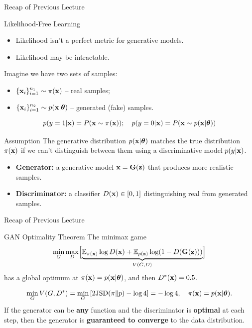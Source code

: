 \documentclass{beamer}
\begin{document}
\begin{frame}
	\titlepage
	\resetonslide	
\end{frame}
\begin{frame}{Recap of Previous Lecture}
	\begin{block}{Likelihood-Free Learning}
		\begin{itemize}
			\item Likelihood isn't a perfect metric for generative models.
			\item Likelihood may be intractable.
		\end{itemize}
	\end{block}
	Imagine we have two sets of samples:
	\begin{itemize}
		\item $\{\mathbf{x}_i\}_{i=1}^{n_1} \sim \pi(\mathbf{x})$ -- real samples;
		\item $\{\mathbf{x}_i\}_{i=1}^{n_2} \sim p(\mathbf{x} | \boldsymbol{\theta})$ -- generated (fake) samples.
	\end{itemize}
	\[
		p(y = 1 | \mathbf{x}) = P(\mathbf{x} \sim \pi(\mathbf{x})); \quad p(y = 0 | \mathbf{x}) = P(\mathbf{x} \sim p(\mathbf{x} | \boldsymbol{\theta}))
	\]
	\vspace{-0.5cm}
	\begin{block}{Assumption}
		The generative distribution $p(\mathbf{x} | \boldsymbol{\theta})$ matches the true distribution $\pi(\mathbf{x})$ if we can't distinguish between them using a discriminative model $p(y|\mathbf{x})$.
	\end{block}
	\begin{itemize}
		\item \textbf{Generator:} a generative model $\mathbf{x} = \mathbf{G}(\mathbf{z})$ that produces more realistic samples.
		\item \textbf{Discriminator:} a classifier $D(\mathbf{x}) \in [0, 1]$ distinguishing real from generated samples.
	\end{itemize}
\end{frame}
\begin{frame}{Recap of Previous Lecture}
	\begin{block}{GAN Optimality Theorem}
		The minimax game
		\[
		\min_{G} \max_D \Bigl[ \underbrace{\mathbb{E}_{\pi(\mathbf{x})} \log D(\mathbf{x}) + \mathbb{E}_{p(\mathbf{z})} \log (1 - D(\mathbf{G}(\mathbf{z})))}_{V(G, D)} \Bigr]
		\]
		has a global optimum at $\pi(\mathbf{x}) = p(\mathbf{x} | \boldsymbol{\theta})$, and then $D^*(\mathbf{x}) = 0.5$.
	\end{block}
	\vspace{-0.3cm}
	\[
		\min_{G} V(G, D^*) = \min_{G} \left[ 2 \mathrm{JSD}(\pi \| p) - \log 4 \right] = -\log 4, \quad \pi(\mathbf{x}) = p(\mathbf{x} | \boldsymbol{\theta}).
	\]
	If the generator can be \textbf{any} function and the discriminator is \textbf{optimal} at each step, then the generator is \textbf{guaranteed to converge} to the data distribution.  
\end{frame}
\end{document}
